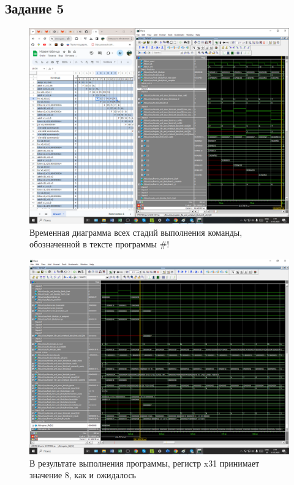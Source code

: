 \documentclass[a4paper,oneside,14pt]{extarticle}
\begin{document}
\subsection{Задание 5}

\begin{figure}[H]
	\centering
	\includegraphics[width=1\textwidth]{img/5.png}
    \caption{Временная диаграмма всех стадий выполнения команды, обозначенной в тексте программы \#!}
	\label{fig:5}
\end{figure}

\begin{figure}[H]
	\centering
	\includegraphics[width=1\textwidth]{img/x31.png}
    \caption{В результате выполнения программы, регистр x31 принимает значение 8, как и ожидалось}
	\label{fig:x31}
\end{figure}
\end{document}
